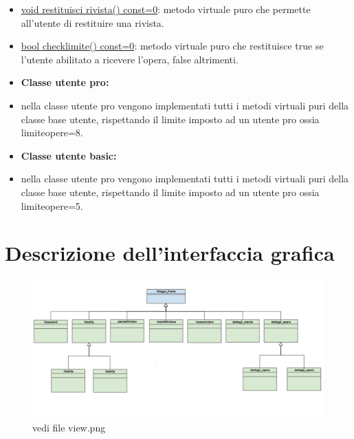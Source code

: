 \documentclass[10pt]{article}
\begin{document}
\begin{itemize}
		\item \underline{void restituisci rivista() const=0}: metodo virtuale puro che permette all'utente di restituire una rivista.

		\item \underline{bool checklimite() const=0}: metodo virtuale puro che restituisce true se l'utente abilitato a ricevere l'opera, false altrimenti.


\item	\textbf{Classe utente pro:}

 	\item nella classe utente pro vengono implementati tutti i metodi virtuali puri della classe base utente, rispettando il limite imposto ad un utente pro ossia limiteopere=8.

\item \textbf{Classe utente basic:}

\item nella classe utente pro vengono implementati tutti i metodi virtuali puri della classe base utente, rispettando il limite imposto ad un utente pro ossia limiteopere=5.

\end{itemize}


\section{Descrizione dell'interfaccia grafica}
\begin{figure}[ht!]
\centering
\includegraphics[scale=0.2]{view}
\caption{vedi file view.png}
\end{figure} 
\end{document}
